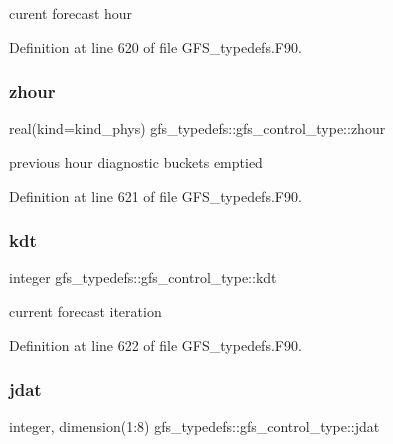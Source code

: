curent forecast hour 



Definition at line 620 of file G\+F\+S\+\_\+typedefs.\+F90.

\mbox{\label{structgfs__typedefs_1_1gfs__control__type_a0b20e827210c6a6357daa24934ae3a99}} 
\subsubsection{zhour}
{\footnotesize\ttfamily real(kind=kind\+\_\+phys) gfs\+\_\+typedefs\+::gfs\+\_\+control\+\_\+type\+::zhour}



previous hour diagnostic buckets emptied 



Definition at line 621 of file G\+F\+S\+\_\+typedefs.\+F90.

\mbox{\label{structgfs__typedefs_1_1gfs__control__type_a9743f78cc411821c4fe157d7abdd85b4}} 
\subsubsection{kdt}
{\footnotesize\ttfamily integer gfs\+\_\+typedefs\+::gfs\+\_\+control\+\_\+type\+::kdt}



current forecast iteration 



Definition at line 622 of file G\+F\+S\+\_\+typedefs.\+F90.

\mbox{\label{structgfs__typedefs_1_1gfs__control__type_a6f2e54633e3a47c4017bcd669ebc979e}} 
\subsubsection{jdat}
{\footnotesize\ttfamily integer, dimension(1\+:8) gfs\+\_\+typedefs\+::gfs\+\_\+control\+\_\+type\+::jdat}



